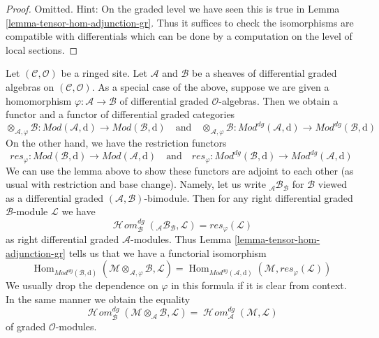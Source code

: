 \documentclass{stacks-project}
\theoremstyle{plain}
\theoremstyle{definition}
\theoremstyle{remark}
\numberwithin{equation}{subsection}
\def\Hom{\mathop{\mathrm{Hom}}\nolimits}
\def\SheafHom{\mathop{\mathcal{H}\!\mathit{om}}\nolimits}
\begin{document}
\begin{proof}
Omitted. Hint: On the graded level we have seen this is true in
Lemma \ref{lemma-tensor-hom-adjunction-gr}. Thus it suffices
to check the isomorphisms are compatible with differentials
which can be done by a computation on the level of local sections.
\end{proof}

\noindent
Let $(\mathcal{C}, \mathcal{O})$ be a ringed site. Let $\mathcal{A}$
and $\mathcal{B}$ be a sheaves of differential graded algebras on
$(\mathcal{C}, \mathcal{O})$.
As a special case of the above, suppose we are given
a homomorphism $\varphi : \mathcal{A} \to \mathcal{B}$
of differential graded $\mathcal{O}$-algebras. Then we obtain a functor
and a functor of differential graded categories
$$
\otimes_{\mathcal{A}, \varphi} \mathcal{B} :
\textit{Mod}(\mathcal{A}, \text{d})
\longrightarrow
\textit{Mod}(\mathcal{B}, \text{d})
\quad\text{and}\quad
\otimes_{\mathcal{A}, \varphi} \mathcal{B} :
\textit{Mod}^{dg}(\mathcal{A}, \text{d})
\longrightarrow
\textit{Mod}^{dg}(\mathcal{B}, \text{d})
$$
On the other hand, we have the restriction functors
$$
res_\varphi :
\textit{Mod}(\mathcal{B}, \text{d})
\longrightarrow
\textit{Mod}(\mathcal{A}, \text{d})
\quad\text{and}\quad
res_\varphi :
\textit{Mod}^{dg}(\mathcal{B}, \text{d})
\longrightarrow
\textit{Mod}^{dg}(\mathcal{A}, \text{d})
$$
We can use the lemma above to show these functors are adjoint to
each other (as usual with restriction and base change). Namely,
let us write ${}_\mathcal{A}\mathcal{B}_\mathcal{B}$ for
$\mathcal{B}$ viewed as a differential graded
$(\mathcal{A}, \mathcal{B})$-bimodule.
Then for any right differential graded $\mathcal{B}$-module $\mathcal{L}$
we have
$$
\SheafHom_\mathcal{B}^{dg}({}_\mathcal{A}\mathcal{B}_\mathcal{B}, \mathcal{L})
= res_\varphi(\mathcal{L})
$$
as right differential graded $\mathcal{A}$-modules. Thus
Lemma \ref{lemma-tensor-hom-adjunction-gr}
tells us that we have a functorial isomorphism
$$
\Hom_{\textit{Mod}^{dg}(\mathcal{B}, \text{d})}(
\mathcal{M} \otimes_{\mathcal{A}, \varphi} \mathcal{B}, \mathcal{L}) =
\Hom_{\textit{Mod}^{dg}(\mathcal{A}, \text{d})}(
\mathcal{M}, res_\varphi(\mathcal{L}))
$$
We usually drop the dependence on $\varphi$ in this formula if it
is clear from context. In the same manner we obtain
the equality
$$
\SheafHom^{dg}_\mathcal{B}(
\mathcal{M} \otimes_\mathcal{A} \mathcal{B}, \mathcal{L}) =
\SheafHom_\mathcal{A}^{dg}(\mathcal{M}, \mathcal{L})
$$
of graded $\mathcal{O}$-modules.
\end{document}
